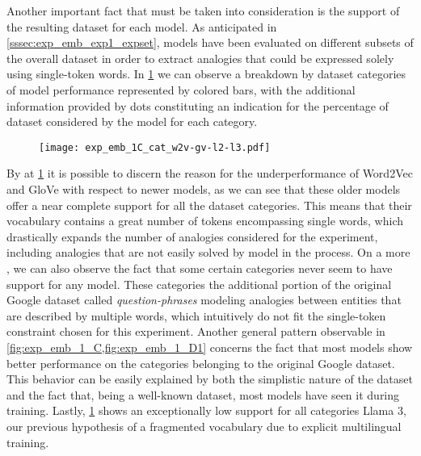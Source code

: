 Another important fact that must be taken into consideration is the support of the resulting dataset for each model.
As anticipated in \cref{sssec:exp_emb_exp1_expset}, models have been evaluated on different subsets of the overall dataset in order to extract analogies that could be expressed solely using single-token words.
In \cref{fig:exp_emb_1_C} we can observe a breakdown by dataset categories of model performance represented by colored bars, with the additional information provided by dots constituting an indication for the percentage of dataset considered by the model for each category.

\begin{figure}[t!]
    \centering
    \texttt{[image: exp\_emb\_1C\_cat\_w2v-gv-l2-l3.pdf]}
    \caption{}
    \label{fig:exp_emb_1_C}
\end{figure}

By  at \cref{fig:exp_emb_1_C} it is possible to discern the reason for the underperformance of Word2Vec and GloVe with respect to newer models, as we can see that these older models offer a near complete support for all the dataset categories.
This means that their vocabulary contains a great number of tokens encompassing single words, which drastically expands the number of analogies considered for the experiment, including analogies that are not easily solved by model in the process.
On a more , we can also observe the fact that some certain categories never seem to have support for any model.
These categories  the additional portion of the original Google dataset called \emph{question-phrases} modeling analogies between entities that are described by multiple words, which intuitively do not fit the single-token constraint chosen for this experiment.
Another general pattern observable in \cref{fig:exp_emb_1_C,fig:exp_emb_1_D1} concerns the fact that most models show better performance on the categories belonging to the original Google dataset.
This behavior can be easily explained by both the simplistic nature of the dataset and the fact that, being a well-known dataset, most models have seen it during training.
Lastly, \cref{fig:exp_emb_1_C} shows an exceptionally low support for all categories  Llama 3,  our previous hypothesis of a fragmented vocabulary due to explicit multilingual training.

